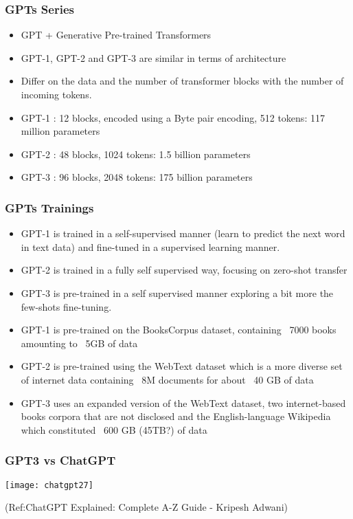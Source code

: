 \begin{frame}[fragile]\frametitle{GPTs Series}


\begin{itemize}
\item GPT + Generative Pre-trained Transformers
\item GPT-1, GPT-2 and GPT-3 are similar in terms of architecture 
\item Differ on the data and the number of transformer blocks with the number of incoming tokens.   
\item GPT-1 : 12 blocks, encoded using a Byte pair encoding, 512 tokens: 117 million parameters 
\item GPT-2 : 48 blocks, 1024 tokens: 1.5 billion parameters 
\item GPT-3 : 96 blocks, 2048 tokens: 175 billion parameters 
\end{itemize}	 

\end{frame}

\begin{frame}[fragile]\frametitle{GPTs Trainings}


\begin{itemize}
\item GPT-1 is trained in a self-supervised manner (learn to predict the next word in text data) and fine-tuned in a supervised learning manner. 
\item GPT-2 is trained in a fully self supervised way, focusing on zero-shot transfer
\item  GPT-3 is pre-trained in a self supervised manner exploring a bit more the few-shots fine-tuning.
\item GPT-1 is pre-trained on the BooksCorpus dataset, containing ~7000 books amounting to ~5GB of data
\item GPT-2 is pre-trained using the WebText dataset which is a more diverse set of internet data containing ~8M documents for about ~40 GB of data
\item GPT-3 uses an expanded version of the WebText dataset, two internet-based books corpora that are not disclosed and the English-language Wikipedia which constituted ~600 GB (45TB?) of data
\end{itemize}	 

\end{frame}

\begin{frame}[fragile]\frametitle{GPT3 vs ChatGPT}


\begin{center}
\texttt{[image: chatgpt27]}
\end{center}		

\tiny{(Ref:ChatGPT Explained: Complete A-Z Guide - Kripesh Adwani)}
\end{frame}

